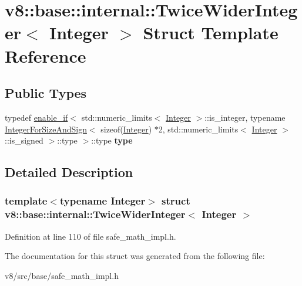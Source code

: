 \hypertarget{structv8_1_1base_1_1internal_1_1TwiceWiderInteger}{}\section{v8\+:\+:base\+:\+:internal\+:\+:Twice\+Wider\+Integer$<$ Integer $>$ Struct Template Reference}
\label{structv8_1_1base_1_1internal_1_1TwiceWiderInteger}
\subsection*{Public Types}
\begin{DoxyCompactItemize}
\item 
\mbox{\label{structv8_1_1base_1_1internal_1_1TwiceWiderInteger_a2902f4ec4476399557bd9237c1aaf351}} 
typedef \mbox{\hyperlink{structv8_1_1base_1_1internal_1_1enable__if}{enable\+\_\+if}}$<$ std\+::numeric\+\_\+limits$<$ \mbox{\hyperlink{classv8_1_1Integer}{Integer}} $>$\+::is\+\_\+integer, typename \mbox{\hyperlink{structv8_1_1base_1_1internal_1_1IntegerForSizeAndSign}{Integer\+For\+Size\+And\+Sign}}$<$ sizeof(\mbox{\hyperlink{classv8_1_1Integer}{Integer}}) $\ast$2, std\+::numeric\+\_\+limits$<$ \mbox{\hyperlink{classv8_1_1Integer}{Integer}} $>$\+::is\+\_\+signed $>$\+::type $>$\+::type {\bfseries type}
\end{DoxyCompactItemize}


\subsection{Detailed Description}
\subsubsection*{template$<$typename Integer$>$\newline
struct v8\+::base\+::internal\+::\+Twice\+Wider\+Integer$<$ Integer $>$}



Definition at line 110 of file safe\+\_\+math\+\_\+impl.\+h.



The documentation for this struct was generated from the following file\+:\begin{DoxyCompactItemize}
\item 
v8/src/base/safe\+\_\+math\+\_\+impl.\+h\end{DoxyCompactItemize}
